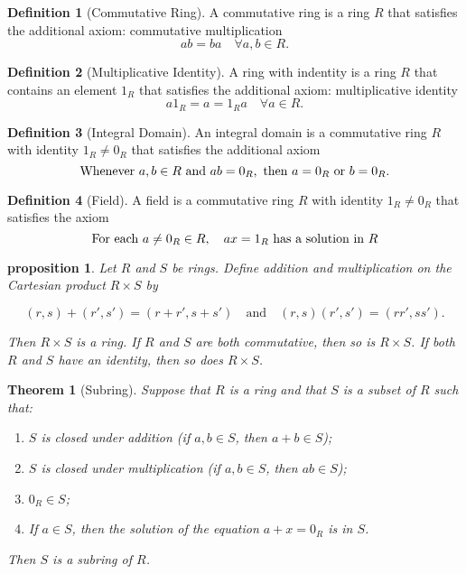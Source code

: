 \documentclass{article}
\newtheorem{theorem}{Theorem}[section]
\newtheorem{proposition}{Proposition}[section]
\newtheorem{proposition}{proposition}[section]
\theoremstyle{definition}
\newtheorem{definition}{Definition}[section]
\theoremstyle{remark}
\begin{document}
\begin{definition}[Commutative Ring]\label{def:commutative_ring}
A commutative ring is a ring \(R\) that satisfies the additional axiom: commutative multiplication
\[
ab = ba \quad \forall a,b \in R.
\]
\end{definition}

\begin{definition}[Multiplicative Identity] \label{def: multiplicative identity}
A ring with indentity is a ring \(R\) that contains an element \(1_R\) that satisfies the additional axiom: multiplicative identity
\[
a1_R = a = 1_R a \quad \forall a \in R.
\]
\end{definition}

\begin{definition}[Integral Domain]\label{def:integral domain}
An integral domain is a commutative ring \(R\) with identity \(1_R \neq 0_R\) that satisfies the additional axiom
\[
\textnormal{Whenever } a,b \in R \textnormal{ and } ab = 0_R, \textnormal{ then } a = 0_R \textnormal{ or } b = 0_R.
\]

\end{definition}


\begin{definition}[Field]\label{def:field}
A field is a commutative ring \(R\) with identity \(1_R \neq 0_R\) that satisfies the axiom 
\[
\textnormal{For each } a \neq 0_R \in R, \quad ax = 1_R \textnormal{ has a solution in \(R\)}
\]
\end{definition}









\begin{proposition}\label{prp:cartesian prod ring}
Let $R$ and $S$ be rings. Define addition and multiplication on the Cartesian product $R \times S$ by

\[
(r, s) + (r', s') = (r + r', s + s') \quad \text{and} \quad (r, s)(r', s') = (rr', ss').
\]

Then $R \times S$ is a ring. If $R$ and $S$ are both commutative, then so is $R \times S$. If both $R$ and $S$ have an identity, then so does $R \times S$.
\end{proposition}





\begin{theorem}[Subring] \label{thm:check for subring}
Suppose that $R$ is a ring and that $S$ is a subset of $R$ such that:
\begin{enumerate}
\item $S$ is closed under addition (if $a, b \in S$, then $a + b \in S$);
\item $S$ is closed under multiplication (if $a, b \in S$, then $ab \in S$);
\item $0_R \in S$;
\item If $a \in S$, then the solution of the equation $a + x = 0_R$ is in $S$.
\end{enumerate}
Then $S$ is a subring of $R$.
\end{theorem}
\end{document}

